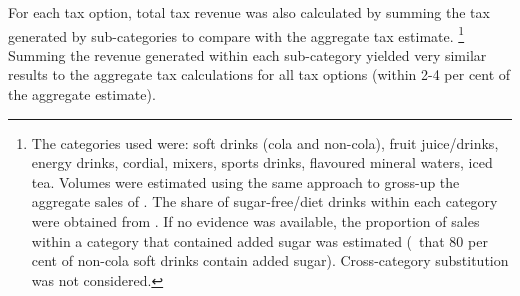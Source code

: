 \documentclass[embargoed]{grattan}
\begin{document}
For each \SSB{} tax option, total \SSB{} tax revenue was also calculated by summing the tax generated by \SSB{} sub-categories to compare with the aggregate \SSB{} tax estimate.%
\footnote{The \SSB{} categories used were: soft drinks (cola and non-cola), fruit juice/drinks, energy drinks, cordial, mixers, sports drinks, flavoured mineral waters, iced tea.
Volumes were estimated using the same approach to gross-up the aggregate sales of \SSBs{}.
The share of sugar-free/diet drinks within each category were obtained from \textcite[][Table~1]{Levy2014QuenchingAustraliasthirst}.
If no evidence was available, the proportion of sales within a category that contained added sugar was estimated (\eg~that 80 per cent of non-cola soft drinks contain added sugar).
Cross-category substitution was not considered.} Summing the revenue generated within each \SSB{} sub-category yielded very similar results to the aggregate \SSB{} tax calculations for all \SSB{} tax options (within 2-4 per cent of the aggregate estimate).

\printbibliography
\end{document}
